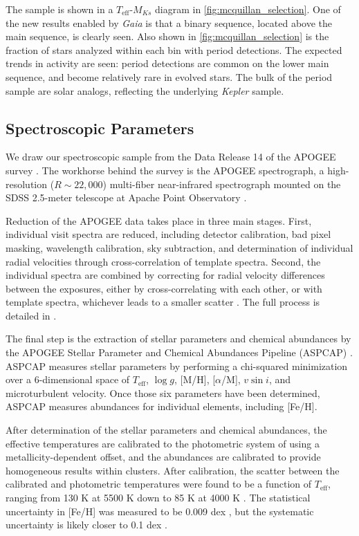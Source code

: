 \documentclass[twocolumn]{aastex6}
\newcommand{\vsini}{\ensuremath{v \sin i}}
\newcommand{\Kepler}{\mbox{\textit{Kepler}}}
\newcommand{\Gaia}{\mbox{\textit{Gaia}}}
\newcommand{\Teff}{\ensuremath{T_{\textrm{eff}}}}
\newcommand{\logg}{\ensuremath{\log g}}
\newcommand{\MK}{\ensuremath{M_{Ks}}}
\newcommand{\feh}{\textrm{[Fe/H]}}
\begin{document}
The \citet{McQuillan14} sample is shown in a \Teff-\MK{}
diagram in \cref{fig:mcquillan_selection}. One of the new results enabled by 
\Gaia{} is that a binary sequence,
located above the main sequence, is clearly seen. Also shown in
\cref{fig:mcquillan_selection} is the fraction of stars analyzed within each
bin with period detections. The expected trends in activity are seen: period 
detections are common on the lower main sequence, and become relatively rare 
in evolved stars. The bulk of the period sample are solar analogs, reflecting 
the underlying \Kepler{} sample.

\subsection{Spectroscopic Parameters}
\label{sec:speccat}

We draw our spectroscopic sample from the Data Release 14 \citep{Abolfathi18}
of the APOGEE survey \citep{Majewski17}. The workhorse behind the survey is the
APOGEE spectrograph, a high-resolution (\(R \sim 22,000\)) multi-fiber
near-infrared spectrograph \citep{Wilson10} mounted on the SDSS 2.5-meter
telescope at Apache Point Observatory \citep{Gunn06}.

Reduction of the APOGEE data takes place in three main stages. First,
individual visit spectra are reduced, including detector calibration, bad pixel
masking, wavelength calibration, sky subtraction, and determination of
individual radial velocities through cross-correlation of template spectra.
Second, the individual spectra are combined by correcting for radial velocity
differences between the exposures, either by cross-correlating with each other,
or with template spectra, whichever leads to a smaller scatter
\citep{Holtzman18}. The full process is detailed in \citet{Nidever15}.

The final step is the extraction of stellar parameters and chemical abundances
by the APOGEE Stellar Parameter and Chemical Abundances Pipeline (ASPCAP)
\citep{GarciaPerez16}. ASPCAP measures stellar parameters by performing a
chi-squared minimization \citep{AllendePrieto06} over a 6-dimensional space of
\Teff, \logg, [M/H], [\(\alpha\)/M], \vsini, and microturbulent velocity. Once
those six parameters have been determined, ASPCAP measures abundances for
individual elements, including \feh{}.

After determination of the stellar parameters and chemical abundances, the 
effective temperatures are calibrated to the photometric system of \citet{GonzalezHernandez09} using a 
metallicity-dependent offset, and the abundances are calibrated to provide
homogeneous results within clusters. After calibration, the scatter between the 
calibrated and photometric temperatures  were found to be a function of 
\Teff{}, ranging from 130 K at 5500 K down to 85 K at 4000 K
\citep{Holtzman18}. The statistical uncertainty in \feh{} was measured to be 
0.009 dex \citep{Holtzman18}, but the systematic uncertainty is likely closer
to 0.1 dex \citep{Serenelli17}.
\end{document}
